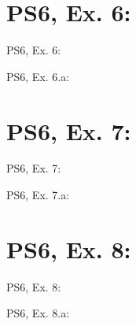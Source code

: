 \section{PS6, Ex. 6: }

\begin{frame}{PS6, Ex. 6: }
  \begin{multicols}{2}
    \vfill\null \columnbreak
    \vfill\null
  \end{multicols}
\end{frame}

\begin{frame}{PS6, Ex. 6.a: }
  \begin{multicols}{2}
    \vfill\null \columnbreak
    \vfill\null
  \end{multicols}
\end{frame}



\section{PS6, Ex. 7: }

\begin{frame}{PS6, Ex. 7: }
  \begin{multicols}{2}
    \vfill\null \columnbreak
    \vfill\null
  \end{multicols}
\end{frame}

\begin{frame}{PS6, Ex. 7.a: }
  \begin{multicols}{2}
    \vfill\null \columnbreak
    \vfill\null
  \end{multicols}
\end{frame}



\section{PS6, Ex. 8: }

\begin{frame}{PS6, Ex. 8: }
  \begin{multicols}{2}
    \vfill\null \columnbreak
    \vfill\null
  \end{multicols}
\end{frame}

\begin{frame}{PS6, Ex. 8.a: }
  \begin{multicols}{2}
    \vfill\null \columnbreak
    \vfill\null
  \end{multicols}
\end{frame}



